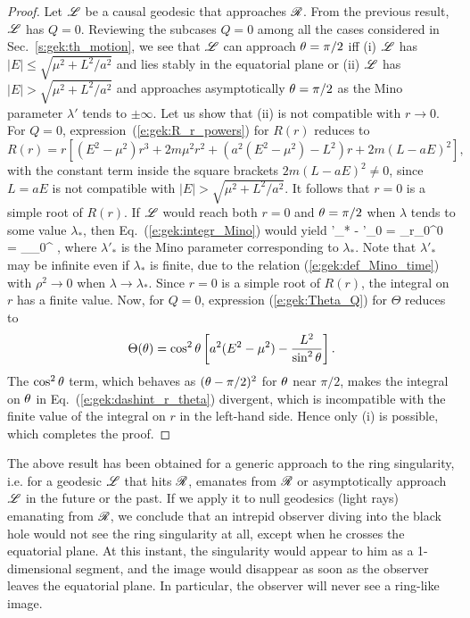 \begin{proof}
Let $\mathscr{L}$ be a causal geodesic that approaches $\mathscr{R}$. From the previous result,
$\mathscr{L}$ has $Q=0$. Reviewing the subcases $Q=0$ among all the cases considered in
Sec.~\ref{s:gek:th_motion}, we see that $\mathscr{L}$ can approach $\theta=\pi/2$ iff
(i) $\mathscr{L}$ has
$|E|\leq \sqrt{\mu^2 + L^2/a^2}$ and lies stably in the equatorial plane
or (ii) $\mathscr{L}$ has $|E| > \sqrt{\mu^2 + L^2/a^2}$ and approaches asymptotically
$\theta=\pi/2$ as the Mino parameter $\lambda'$ tends to $\pm\infty$.
Let us show that (ii) is not compatible with $r\to 0$.
For $Q=0$, expression~(\ref{e:gek:R_r_powers}) for $R(r)$ reduces to
\[
 R(r) = r \left[ (E^2 - \mu^2) r^3 + 2 m \mu^2 r^2
     + \left( a^2(E^2 - \mu^2) - L^2 \right) r
     + 2m (L - a E)^2 \right] ,
\]
with the constant term inside the square brackets $2m(L - a E)^2 \neq 0$,
since $L=a E$ is not compatible with $|E| > \sqrt{\mu^2 + L^2/a^2}$. It
follows that $r=0$ is a simple root of $R(r)$. If $\mathscr{L}$ would reach both
$r=0$ and $\theta=\pi/2$ when $\lambda$ tends to some value $\lambda_*$,
then Eq.~(\ref{e:gek:integr_Mino}) would yield
\be \label{e:gek:dashint_r_theta}
    \lambda'_* - \lambda'_0 = \dashint_{r_0}^0 
    = \dashint_{\th_0}^{} \frac{\eps_\th \, \D \th}{\sqrt{\Theta(\th)}} ,
\ee
where $\lambda'_*$ is the Mino parameter corresponding to $\lambda_*$. Note that
$\lambda'_*$ may be infinite even if $\lambda_*$ is finite, due to the
relation (\ref{e:gek:def_Mino_time}) with $\rho^2\to 0$ when $\lambda\to\lambda_*$.
Since $r=0$ is a simple root of $R(r)$, the integral on $r$ has a finite value.
Now, for $Q=0$, expression (\ref{e:gek:Theta_Q}) for $\Theta$ reduces to
\[
    \Theta(\theta) = \cos^2\theta \left[ a^2 (E^2 - \mu^2)
    - \frac{L^2}{\sin^2\theta} \right] .
\]
The $\cos^2\theta$ term, which behaves as $(\theta - \pi/2)^2$ for $\theta$ near $\pi/2$,
makes the integral on $\theta$ in
Eq.~(\ref{e:gek:dashint_r_theta}) divergent, which is incompatible with the
finite value of the integral on $r$ in the left-hand side. Hence only (i) is possible, which completes
the proof.
\end{proof}

The above result has been obtained for a generic approach to the ring singularity,
i.e. for a geodesic $\mathscr{L}$ that hits $\mathscr{R}$, emanates from $\mathscr{R}$ or
asymptotically approach $\mathscr{L}$ in the future or the past. If we apply it to
null geodesics (light rays) emanating from $\mathscr{R}$, we conclude that an intrepid observer
diving into the black hole would not see the ring singularity at all, except when
he crosses the equatorial plane. At this instant, the singularity would appear
to him as a 1-dimensional segment, and the image would disappear as soon as the observer
leaves the equatorial plane. In particular, the observer will never see a ring-like image.


